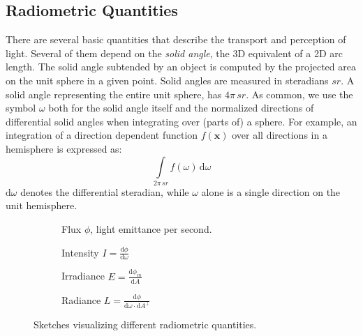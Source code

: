 \documentclass[thesis.tex]{subfiles}
\begin{document}
\subsection{Radiometric Quantities}
There are several basic quantities that describe the transport and perception of light.
Several of them depend on the \emph{solid angle}, the 3D equivalent of a 2D arc length.
The solid angle subtended by an object is computed by the projected area on the unit sphere in a given point.
Solid angles are measured in steradians $sr$.
A solid angle representing the entire unit sphere, has $4\pi\,sr$.
As common, we use the symbol $\omega$ both for the solid angle itself and the normalized directions of differential solid angles when integrating over (parts of) a sphere.
For example, an integration of a direction dependent function $f(\mathbf{x})$ over all directions in a hemisphere is expressed as:
\begin{equation}
\int\limits_{2\pi\,sr} f(\omega) \, \mathrm{d}\omega
\end{equation} 
$\mathrm{d}\omega$ denotes the differential steradian, while $\omega$ alone is a single direction on the unit hemisphere. 

\begin{figure}[h]
\centering
\begin{subfigure}[b]{0.45\textwidth}
\centering
{}
\caption{Flux $\phi$, light emittance per second.}
\label{fig:flux}
\end{subfigure}
\begin{subfigure}[b]{0.45\textwidth}
\centering
{}
\caption{Intensity $I = \frac{\mathrm{d}\phi}{\mathrm{d}\omega}$}
\label{fig:intensity}
\end{subfigure}

\vspace{10pt}

\begin{subfigure}[b]{0.45\textwidth}
\centering
{}
\caption{Irradiance $E = \frac{\mathrm{d}\phi_{in}}{\mathrm{d}A}$}
\label{fig:irradiance}
\end{subfigure}
\begin{subfigure}[b]{0.45\textwidth}
\centering
{}
\caption{Radiance $L = \frac{\mathrm{d}\phi}{\mathrm{d}\omega \cdot \mathrm{d}A^\perp }$}
\label{fig:radiance}
\end{subfigure}
\caption{Sketches visualizing different radiometric quantities.}
\end{figure}
\end{document}
